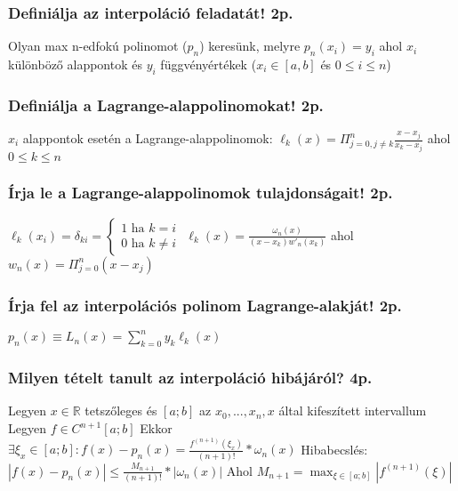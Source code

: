 \documentclass[12pt,a4paper]{article}
\begin{document}
\subsubsection{Definiálja az interpoláció feladatát! 2p.}

Olyan max n-edfokú polinomot ($p_n$) keresünk, melyre $p_n(x_i)=y_i$ ahol $x_i$ különböző alappontok és $y_i$ függvényértékek ($x_i \in [a,b]$ és $0 \le i \le n$)

\subsubsection{Definiálja a Lagrange-alappolinomokat! 2p.}

$x_i$ alappontok esetén a Lagrange-alappolinomok: $\ell_k(x) = \Pi_{j=0,j \ne k}^n \frac{x-x_j}{x_k-x_j}$ ahol $0 \le k \le n$

\subsubsection{Írja le a Lagrange-alappolinomok tulajdonságait! 2p.}

\begin{outline}
	\1 $\ell_k(x_i) = \delta_{ki} = \begin{cases}
		1 \text{ ha } k=i\\
		0 \text{ ha } k \ne i
	\end{cases}$
	\1 $\ell_k(x) = \frac{\omega_n(x)}{(x-x_k)w'_n(x_k)}$ ahol $w_n(x) = \Pi_{j=0}^n(x-x_j)$
\end{outline}

\subsubsection{Írja fel az interpolációs polinom Lagrange-alakját! 2p.}

$p_n(x) \equiv L_n(x) = \sum_{k=0}^n y_k \ell_k(x)$

\subsubsection{Milyen tételt tanult az interpoláció hibájáról? 4p.}

\begin{outline}
	\1 Legyen $x \in \mathbb{R}$ tetszőleges és $[a;b]$ az $x_0,...,x_n,x$ által kifeszített intervallum
	\1 Legyen $f \in C^{n+1}[a;b]$
	\1 Ekkor $\exists \xi_x \in [a;b]: f(x)-p_n(x)=\frac{f^{(n+1)}(\xi_x)}{(n+1)!}*\omega_n(x)$
	\1 Hibabecslés: $|f(x)-p_n(x)| \le \frac{M_{n+1}}{(n+1)!}*|\omega_n(x)|$
		\2 Ahol $M_{n+1} = \max_{\xi \in [a;b]} |f^{(n+1)}(\xi)|$
\end{outline}
\end{document}
